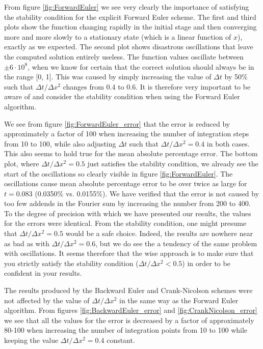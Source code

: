 \documentclass[reprint, english,notitlepage,nofootinbib]{revtex4-1}  %
\begin{document}
From figure \ref{fig:ForwardEuler} we see very clearly the importance of satisfying the stability condition for the explicit Forward Euler scheme. The first and third plots show the function changing rapidly in the initial stage and then converging more and more slowly to a stationary state (which is a linear function of \(x\)), exactly as we expected. The second plot shows disastrous oscillations that leave the computed solution entirely useless. The function values oscillate between \(\pm 6 \cdot 10^8\), when we know for certain that the correct solution should always be in the range [0, 1]. This was caused by simply increasing the value of \(\Delta t\) by 50\% such that \(\Delta t / \Delta x^2\) changes from 0.4 to 0.6. It is therefore very important to be aware of and consider the stability condition when using the Forward Euler algorithm.

We see from figure \ref{fig:ForwardEuler_error} that the error is reduced by approximately a factor of 100 when increasing the number of integration steps from 10 to 100, while also adjusting \(\Delta t\) such that \(\Delta t / \Delta x^2 = 0.4\) in both cases. This also seems to hold true for the mean absolute percentage error. The bottom plot, where \(\Delta t / \Delta x^2 = 0.5\) just satisfies the stability condition, we already see the start of the oscillations so clearly visible in figure \ref{fig:ForwardEuler}. The oscillations cause mean absolute percentage error to be over twice as large for \(t = 0.083\) (0.0350\% vs. 0.0155\%). We have verified that the error is not caused by too few addends in the Fourier sum by increasing the number from 200 to 400. To the degree of precision with which we have presented our results, the values for the errors were identical.
From the stability condition, one might presume that \(\Delta t / \Delta x^2 = 0.5\) would be a safe choice. Indeed, the results are nowhere near as bad as with \(\Delta t / \Delta x^2 = 0.6\), but we do see the a tendency of the same problem with oscillations. It seems therefore that the wise approach is to make sure that you strictly satisfy the stability condition (\(\Delta t / \Delta x^2 < 0.5\)) in order to be confident in your results.

The results produced by the Backward Euler and Crank-Nicolson schemes were not affected by the value of \(\Delta t / \Delta x^2\) in the same way as the Forward Euler algorithm. From figures \ref{fig:BackwardEuler_error} and \ref{fig:CrankNicolson_error} we see that all the values for the error is decreased by a factor of approximately 80-100 when increasing the number of integration points from 10 to 100 while keeping the value \(\Delta t / \Delta x^2 = 0.4\) constant.
\end{document}
